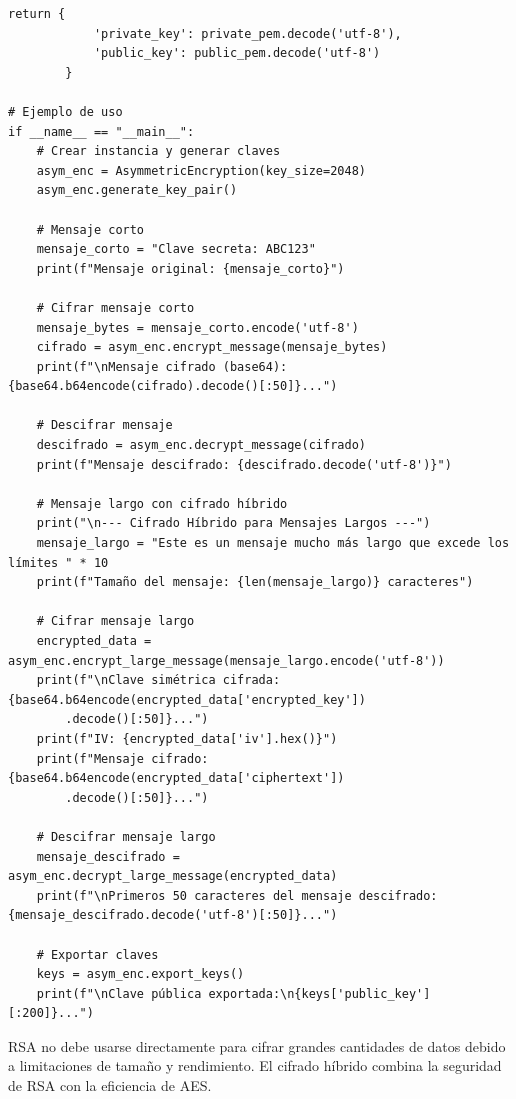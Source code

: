 \documentclass[12pt,a4paper]{article}
\begin{document}
\begin{lstlisting}[caption=Implementación de cifrado asimétrico con RSA]
        return {
            'private_key': private_pem.decode('utf-8'),
            'public_key': public_pem.decode('utf-8')
        }

# Ejemplo de uso
if __name__ == "__main__":
    # Crear instancia y generar claves
    asym_enc = AsymmetricEncryption(key_size=2048)
    asym_enc.generate_key_pair()
    
    # Mensaje corto
    mensaje_corto = "Clave secreta: ABC123"
    print(f"Mensaje original: {mensaje_corto}")
    
    # Cifrar mensaje corto
    mensaje_bytes = mensaje_corto.encode('utf-8')
    cifrado = asym_enc.encrypt_message(mensaje_bytes)
    print(f"\nMensaje cifrado (base64): {base64.b64encode(cifrado).decode()[:50]}...")
    
    # Descifrar mensaje
    descifrado = asym_enc.decrypt_message(cifrado)
    print(f"Mensaje descifrado: {descifrado.decode('utf-8')}")
    
    # Mensaje largo con cifrado híbrido
    print("\n--- Cifrado Híbrido para Mensajes Largos ---")
    mensaje_largo = "Este es un mensaje mucho más largo que excede los límites " * 10
    print(f"Tamaño del mensaje: {len(mensaje_largo)} caracteres")
    
    # Cifrar mensaje largo
    encrypted_data = asym_enc.encrypt_large_message(mensaje_largo.encode('utf-8'))
    print(f"\nClave simétrica cifrada: {base64.b64encode(encrypted_data['encrypted_key'])
        .decode()[:50]}...")
    print(f"IV: {encrypted_data['iv'].hex()}")
    print(f"Mensaje cifrado: {base64.b64encode(encrypted_data['ciphertext'])
        .decode()[:50]}...")
    
    # Descifrar mensaje largo
    mensaje_descifrado = asym_enc.decrypt_large_message(encrypted_data)
    print(f"\nPrimeros 50 caracteres del mensaje descifrado: {mensaje_descifrado.decode('utf-8')[:50]}...")
    
    # Exportar claves
    keys = asym_enc.export_keys()
    print(f"\nClave pública exportada:\n{keys['public_key'][:200]}...")
\end{lstlisting}

\begin{securityalert}
    RSA no debe usarse directamente para cifrar grandes cantidades de datos debido a limitaciones de tamaño y rendimiento. El cifrado híbrido combina la seguridad de RSA con la eficiencia de AES.
\end{securityalert}

\newpage
\end{document}
